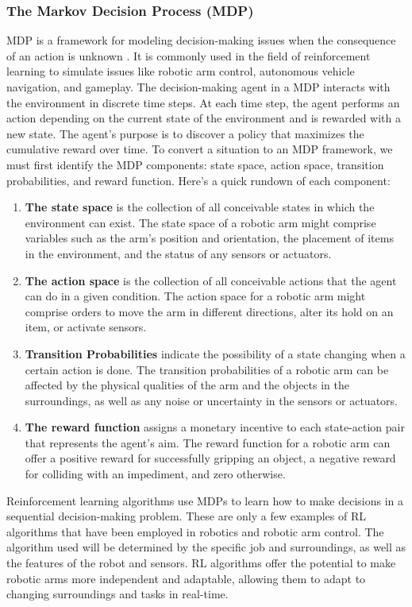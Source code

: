 \documentclass[12pt,oneside]{article}
\begin{document}
\subsubsection{The Markov Decision Process (MDP)}
MDP is a framework for modeling decision-making issues when the consequence of an action is unknown \cite{49_delage2010percentile}. It is commonly used in the field of reinforcement learning to simulate issues like robotic arm control, autonomous vehicle navigation, and gameplay. The decision-making agent in a MDP interacts with the environment in discrete time steps. At each time step, the agent performs an action depending on the current state of the environment and is rewarded with a new state. The agent's purpose is to discover a policy that maximizes the cumulative reward over time.
To convert a situation to an MDP framework, we must first identify the MDP components: state space, action space, transition probabilities, and reward function. Here's a quick rundown of each component:
\begin{enumerate}
\item \textbf{The state space} is the collection of all conceivable states in which the environment can exist. The state space of a robotic arm might comprise variables such as the arm's position and orientation, the placement of items in the environment, and the status of any sensors or actuators.
\item \textbf{The action space} is the collection of all conceivable actions that the agent can do in a given condition. The action space for a robotic arm might comprise orders to move the arm in different directions, alter its hold on an item, or activate sensors.
\item \textbf{Transition Probabilities} indicate the possibility of a state changing when a certain action is done. The transition probabilities of a robotic arm can be affected by the physical qualities of the arm and the objects in the surroundings, as well as any noise or uncertainty in the sensors or actuators.
\item \textbf{The reward function} assigns a monetary incentive to each state-action pair that represents the agent's aim. The reward function for a robotic arm can offer a positive reward for successfully gripping an object, a negative reward for colliding with an impediment, and zero otherwise.
\end{enumerate}
Reinforcement learning algorithms use MDPs to learn how to make decisions in a sequential decision-making problem.
These are only a few examples of RL algorithms that have been employed in robotics and robotic arm control. The algorithm used will be determined by the specific job and surroundings, as well as the features of the robot and sensors. RL algorithms offer the potential to make robotic arms more independent and adaptable, allowing them to adapt to changing surroundings and tasks in real-time.
\end{document}
